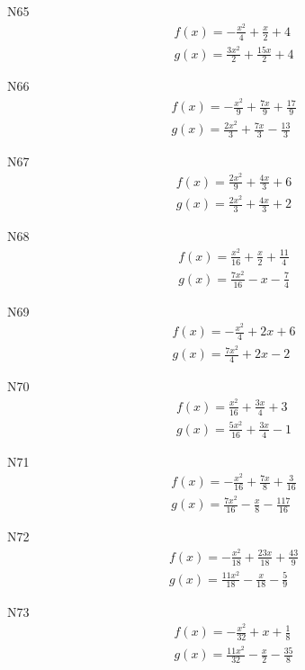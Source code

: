 \documentclass[11pt]{report}
\begin{document}
N65
\begin{align*}
 f(x) = - \frac{x^{2}}{4} + \frac{x}{2} + 4\\
 g(x) = \frac{3 x^{2}}{2} + \frac{15 x}{2} + 4
\end{align*}

N66
\begin{align*}
 f(x) = - \frac{x^{2}}{9} + \frac{7 x}{9} + \frac{17}{9}\\
 g(x) = \frac{2 x^{2}}{3} + \frac{7 x}{3} - \frac{13}{3}
\end{align*}

N67
\begin{align*}
 f(x) = \frac{2 x^{2}}{9} + \frac{4 x}{3} + 6\\
 g(x) = \frac{2 x^{2}}{3} + \frac{4 x}{3} + 2
\end{align*}

N68
\begin{align*}
 f(x) = \frac{x^{2}}{16} + \frac{x}{2} + \frac{11}{4}\\
 g(x) = \frac{7 x^{2}}{16} - x - \frac{7}{4}
\end{align*}

N69
\begin{align*}
 f(x) = - \frac{x^{2}}{4} + 2 x + 6\\
 g(x) = \frac{7 x^{2}}{4} + 2 x - 2
\end{align*}

N70
\begin{align*}
 f(x) = \frac{x^{2}}{16} + \frac{3 x}{4} + 3\\
 g(x) = \frac{5 x^{2}}{16} + \frac{3 x}{4} - 1
\end{align*}

N71
\begin{align*}
 f(x) = - \frac{x^{2}}{16} + \frac{7 x}{8} + \frac{3}{16}\\
 g(x) = \frac{7 x^{2}}{16} - \frac{x}{8} - \frac{117}{16}
\end{align*}

N72
\begin{align*}
 f(x) = - \frac{x^{2}}{18} + \frac{23 x}{18} + \frac{43}{9}\\
 g(x) = \frac{11 x^{2}}{18} - \frac{x}{18} - \frac{5}{9}
\end{align*}

N73
\begin{align*}
 f(x) = - \frac{x^{2}}{32} + x + \frac{1}{8}\\
 g(x) = \frac{11 x^{2}}{32} - \frac{x}{2} - \frac{35}{8}
\end{align*}
\end{document}
